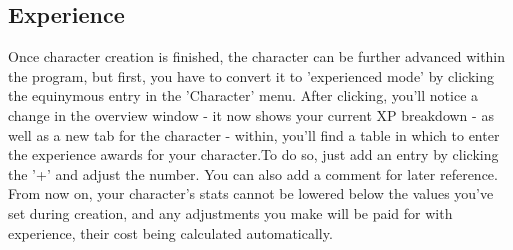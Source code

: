\subsection{Experience}
Once character creation is finished, the character can be further advanced within the program, but first, you have to convert it to 'experienced mode' by clicking the equinymous entry in the 'Character' menu.
After clicking, you'll notice a change in the overview window - it now shows your current XP breakdown - as well as a new tab for the character - within, you'll find a table in which to enter the experience awards for your character.To do so, just add an entry by clicking the '+' and adjust the number. You can also add a comment for later reference.
From now on, your character's stats cannot be lowered below the values you've set during creation, and any adjustments you make will be paid for with experience, their cost being calculated automatically.